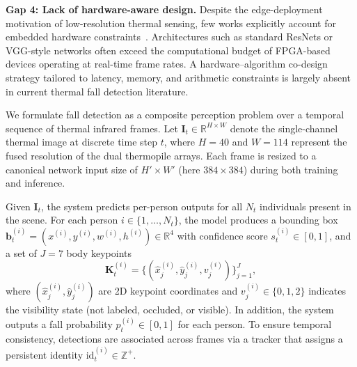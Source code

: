 \textbf{Gap 4: Lack of hardware-aware design.} 
Despite the edge-deployment motivation of low-resolution thermal sensing, few works explicitly account for embedded hardware constraints~\cite{sze2017efficient}. Architectures such as standard ResNets or VGG-style networks often exceed the computational budget of FPGA-based devices operating at real-time frame rates. A hardware–algorithm co-design strategy tailored to latency, memory, and arithmetic constraints is largely absent in current thermal fall detection literature.

We formulate fall detection as a composite perception problem over a temporal sequence of thermal infrared frames. Let $\mathbf{I}_t \in \mathbb{R}^{H \times W}$ denote the single-channel thermal image at discrete time step $t$, where $H=40$ and $W=114$ represent the fused resolution of the dual thermopile arrays. Each frame is resized to a canonical network input size of $H' \times W'$ (here $384 \times 384$) during both training and inference.

Given $\mathbf{I}_t$, the system predicts per-person outputs for all $N_t$ individuals present in the scene. For each person $i \in \{1,\ldots,N_t\}$, the model produces a bounding box $\mathbf{b}_t^{(i)}=(x^{(i)}, y^{(i)}, w^{(i)}, h^{(i)}) \in \mathbb{R}^4$ with confidence score $s_t^{(i)} \in [0,1]$, and a set of $J=7$ body keypoints
\begin{equation}
\mathbf{K}_t^{(i)}=\{(\hat{x}_j^{(i)}, \hat{y}_j^{(i)}, v_j^{(i)})\}_{j=1}^{J},
\end{equation}
where $(\hat{x}_j^{(i)}, \hat{y}_j^{(i)})$ are 2D keypoint coordinates and $v_j^{(i)} \in \{0,1,2\}$ indicates the visibility state (not labeled, occluded, or visible). In addition, the system outputs a fall probability $p_t^{(i)} \in [0,1]$ for each person. To ensure temporal consistency, detections are associated across frames via a tracker that assigns a persistent identity $\mathrm{id}_t^{(i)} \in \mathbb{Z}^+$.

